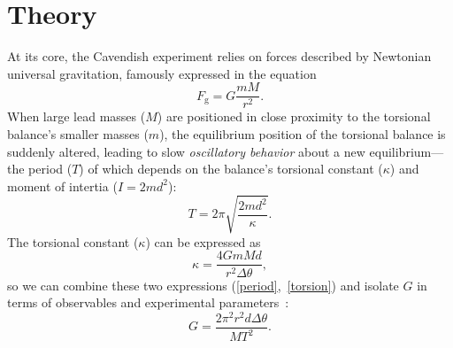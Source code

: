 \documentclass[12pt]{report}
\begin{document}
\section*{Theory}
{
At its core, the Cavendish experiment relies on forces described by Newtonian universal gravitation, famously expressed in the equation
    \begin{equation*}
        F_\mathrm{g} = G \frac{mM}{r^2}.
    \end{equation*} 
When large lead masses (\(M\)) are positioned in close proximity to the torsional balance's smaller masses (\(m\)), the equilibrium position of the torsional balance is suddenly altered, leading to slow \textit{oscillatory behavior} about a new equilibrium—the period (\( T \)) of which depends on the balance's torsional constant (\( \kappa \)) and moment of intertia (\( I = 2md^2 \)):
    \begin{equation}\label{period}
        T = 2\pi \sqrt{\frac{2md^2}{\kappa}}.
    \end{equation}
The torsional constant (\( \kappa \)) can be expressed as 
    \begin{equation}\label{torsion}
        \kappa = \frac{4GmMd}{r^2 \Delta \theta},
    \end{equation}
    so we can combine these two expressions (\ref{period},~\ref{torsion}) and isolate \(G\) in terms of observables and experimental parameters~\cite{BMS2024}:
        \begin{equation}
            G = \frac{2\pi^2r^2d\Delta\theta}{MT^2}. 
        \end{equation}


}
\end{document}
